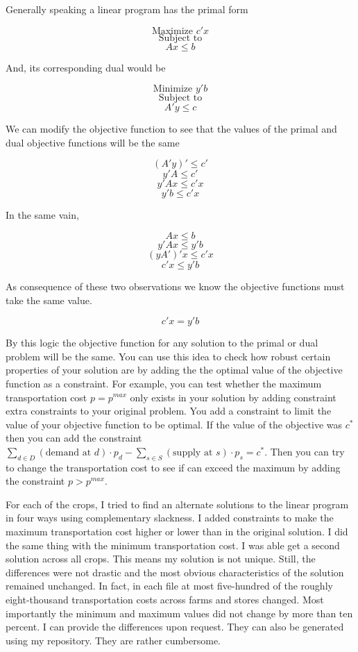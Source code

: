 \documentclass{report}
\begin{document}
Generally speaking a linear program has the primal form

$$\text{Maximize } c' x$$
$$\text{Subject to}$$
$$Ax \leq b$$

And, its corresponding dual would be

$$\text{Minimize } y' b$$
$$\text{Subject to}$$
$$A'y \leq c$$

We can modify the objective function to see that the values of the primal and dual objective functions will be the same

$$(A'y)' \leq c'$$
$$ y'A \leq c'$$
$$ y'Ax \leq c'x$$
$$y' b \leq c'x$$

In the same vain, 

$$ Ax \leq b$$
$$ y'Ax \leq y'b$$
$$ (yA')'x \leq c'x$$
$$ c'x \leq  y' b $$

As consequence of these two observations we know the objective functions must take the same value.

$$c'x = y' b$$

By this logic the objective function for any solution to the primal or dual problem will be the same. You can use this idea to check how robust certain properties of your solution are by adding the the optimal value of the objective function as a constraint. For example, you can test whether the maximum transportation cost $p = p^{max}$ only exists in your solution by adding constraint extra constraints to your original problem. You add a constraint to limit the value of your objective function to be optimal. If the value of the objective was $c^*$ then you can add the constraint  $ \sum_{d \in D}  (\text{demand at } d) \cdot p_{d} -   \sum_{s \in S}  (\text{supply at } s) \cdot p_{s} = c^*$. Then you can try to change the transportation cost to see if can exceed the maximum by adding the constraint $p > p^{max}$.

For each of the crops, I tried to find an alternate solutions to the linear program in four ways using complementary slackness. I added constraints to make the maximum transportation cost higher or lower than in the original solution. I did the same thing with the minimum transportation cost. I was able get a second solution across all crops. This means my solution is not unique. Still, the differences were not drastic and the most obvious characteristics of the solution remained unchanged. In fact, in each file at most five-hundred of the roughly eight-thousand transportation costs across farms and stores changed. Most importantly the minimum and maximum values did not change by more than ten percent. I can provide the differences upon request. They can also be generated using my repository. They are rather cumbersome.
\end{document}
